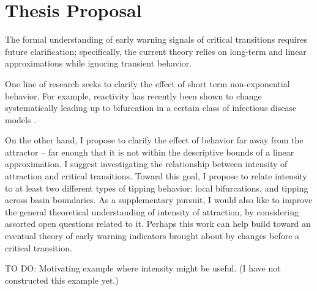 \section{Thesis Proposal}
\label{sec:proposal}

The formal understanding of early warning signals of critical transitions requires future clarification; specifically, the current theory relies on long-term and linear approximations while ignoring transient behavior. 

One line of research seeks to clarify the effect of short term non-exponential behavior. For example, reactivity has recently been shown to change systematically leading up to bifurcation in a certain class of infectious disease models \cite{oreganTransientIndicatorsTipping2020}. 

On the other hand, I propose to clarify the effect of behavior far away from the attractor -- far enough that it is not within the descriptive bounds of a linear approximation. I suggest investigating the relationship between intensity of attraction and critical transitions. 
%
Toward this goal, I propose to relate intensity to at least two different types of tipping behavior: local bifurcations, and tipping across basin boundaries. As a supplementary pursuit, I would also like to improve the general theoretical understanding of intensity of attraction, by considering assorted open questions related to it. 
%
Perhaps this work can help build toward an eventual theory of early warning indicators brought about by changes before a critical transition. 



%

TO DO: Motivating example where intensity might be useful. (I have not constructed this example yet.)


